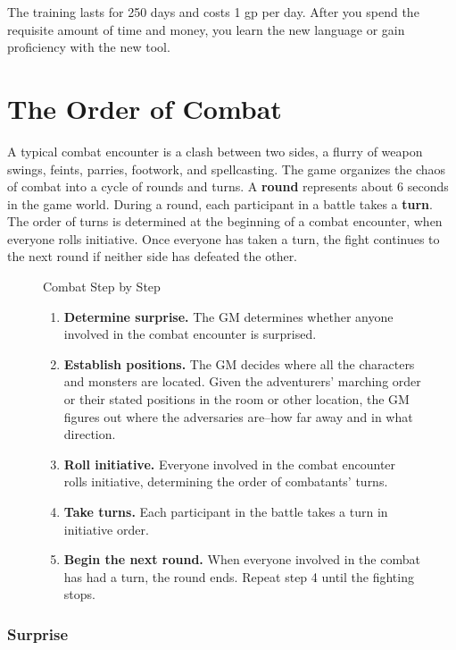The training lasts for 250 days and costs 1 gp per day. After you spend the requisite amount of time and money, you learn the new language or gain proficiency with the new tool.

\chapter{The Order of Combat}\label{ch:order-of-combat}
A typical combat encounter is a clash between two sides, a flurry of weapon swings, feints, parries, footwork, and spellcasting. The game organizes the chaos of combat into a cycle of rounds and turns. A
\textbf{round} represents about 6 seconds in the game world. During a round, each participant in a battle takes a \textbf{turn}. The order of turns is determined at the beginning of a combat encounter, when everyone rolls initiative. Once everyone has taken a turn, the fight continues to the next round if neither side has defeated the other.

\begin{figure}[htb]
    \begin{DndComment}{Combat Step by Step\label{cmt:combat-step-by-step}}
        \begin{enumerate}
            \item \textbf{Determine surprise.} The GM determines whether anyone involved in the combat encounter is surprised.
            \item \textbf{Establish positions.} The GM decides where all the characters and monsters are located. Given the adventurers' marching order or their stated positions in the room or other location, the GM figures out where the adversaries are--how far away and in what direction.
            \item \textbf{Roll initiative.} Everyone involved in the combat encounter rolls initiative, determining the order of combatants' turns.
            \item \textbf{Take turns.} Each participant in the battle takes a turn in initiative order.
            \item \textbf{Begin the next round.} When everyone involved in the combat has had a turn, the round ends. Repeat step 4 until the fighting stops.
        \end{enumerate}
    \end{DndComment}
\end{figure}

\subsection{Surprise}

